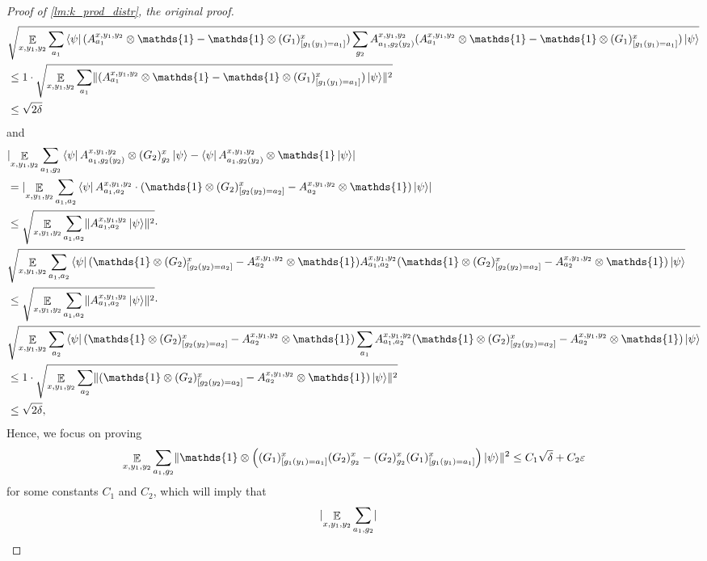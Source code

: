 \documentclass[11pt]{article}
\theoremstyle{plain}
\theoremstyle{definition}
\DeclarePairedDelimiter{\norm}{\lVert}{\rVert}
\DeclarePairedDelimiter{\abs}{\lvert}{\rvert}
\newcommand {\bra} [1] {\ensuremath{ \left\langle #1 \right| }}
\newcommand {\ket} [1] {\ensuremath{ \left| #1 \right\rangle }}
\DeclareMathOperator*{\bigE}{\mathbb{E}}
\newcommand {\id} {\ensuremath{\mathds{1}}}
\newcommand{\ep} {\ensuremath{\varepsilon}}
\newcommand{\x}{\otimes}
\newcommand{\1}{\mathbb{1}} %
\begin{document}
\begin{proof}[Proof of \cref{lm:k_prod_distr}, the original proof]
\begin{align*}
		&
		\sqrt{ \bigE_{x,y_1,y_2} \sum_{a_1} \bra{\psi} (A^{x,y_1,y_2}_{a_1} \x\id -\id\x(G_1)^x_{[g_1(y_1) = a_1]}) \sum_{g_2} A^{x,y_1,y_2}_{a_1, g_2(y_2) }
		(A^{x,y_1,y_2}_{a_1} \x\id -\id\x(G_1)^x_{[g_1(y_1) = a_1]})\ket{\psi}}	\\
		&\leq 1 \cdot \sqrt{ \bigE_{x,y_1,y_2} \sum_{a_1} \norm{(A^{x,y_1,y_2}_{a_1} \x\id -\id\x(G_1)^x_{[g_1(y_1) = a_1]})\ket{\psi}}^2} \\
		&\leq \sqrt{2\delta}
	\end{align*}
	and
	\begin{align*}
		&\abs{\bigE_{x,y_1,y_2} \sum_{a_1, g_2 }\bra{\psi} A^{x,y_1,y_2}_{a_1, g_2(y_2) }  \x 
		 (G_2)^x_{g_2}  \ket{\psi} - \bra{\psi} A^{x,y_1,y_2}_{a_1,g_2(y_2)} \x \id \ket{\psi}} \\
		 &= \abs{ \bigE_{x,y_1,y_2} \sum_{a_1, a_2 } \bra{\psi} A^{x,y_1,y_2}_{a_1, a_2 } \cdot
		 (\id \x (G_2)^x_{[g_2(y_2)=a_2]} - A^{x,y_1,y_2}_{a_2} \x \id) \ket{\psi}} \\
		 &\leq \sqrt{\bigE_{x,y_1,y_2} \sum_{a_1,a_2} \norm{ A^{x,y_1,y_2}_{a_1, a_2 } \ket{\psi}}^2} 
		 \cdot \\
		 & \sqrt{\bigE_{x,y_1,y_2} \sum_{a_1,a_2}\bra{\psi}  (\id \x (G_2)^x_{[g_2(y_2)=a_2]} - A^{x,y_1,y_2}_{a_2} \x \id) 
		 A^{x,y_1,y_2}_{a_1, a_2 } (\id \x (G_2)^x_{[g_2(y_2)=a_2]} - A^{x,y_1,y_2}_{a_2} \x \id) \ket{\psi}} \\
		 & \leq \sqrt{ \bigE_{x,y_1,y_2} \sum_{a_1,a_2} \norm{ A^{x,y_1,y_2}_{a_1, a_2 } \ket{\psi}}^2} \cdot \\
		 & \sqrt{  \bigE_{x,y_1,y_2} \sum_{a_2} \bra{\psi}  (\id \x (G_2)^x_{[g_2(y_2)=a_2]} - A^{x,y_1,y_2}_{a_2} \x \id) 
		 \sum_{a_1} A^{x,y_1,y_2}_{a_1, a_2 } (\id \x (G_2)^x_{[g_2(y_2)=a_2]} - A^{x,y_1,y_2}_{a_2} \x \id) \ket{\psi}} \\
		 & \leq 1 \cdot \sqrt{ \bigE_{x,y_1,y_2} \sum_{a_2} \norm{ (\id \x (G_2)^x_{[g_2(y_2)=a_2]} - A^{x,y_1,y_2}_{a_2} \x \id) \ket{\psi}}^2} \\
		 & \leq \sqrt{2\delta},
	\end{align*}
	Hence, we focus on proving 
	\begin{align}
        \label{eq:g_1g_2}
		\bigE_{x,y_1,y_2} \sum_{a_1, g_2} \norm{ \id \x \left((G_1)^x_{[g_1(y_1) = a_1]}(G_2)^x_{g_2} - (G_2)^x_{g_2}(G_1)^x_{[g_1(y_1) = a_1]}\right) \ket{\psi}}^2 \leq C_1\sqrt{\delta} +C_2 \ep
	\end{align}
	for some constants $C_1$ and $C_2$, which will imply that 
	\begin{align*}
		& \abs{ \bigE_{x,y_1,y_2} \sum_{a_1, g_2} 
}
\end{align*}
\end{proof}
\end{document}
